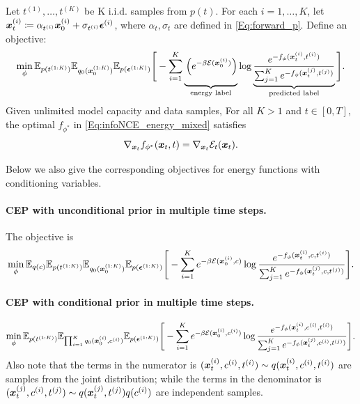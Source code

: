 \begin{theorem}
\label{thrm:infoNCE_energy_mixed}
Let $t^{(1)},\dots,t^{(K)}$ be K i.i.d. samples from $p(t)$. For each $i=1,\dots,K$, let ${\bm{x}}_t^{(i)}\coloneqq \alpha_{t^{(i)}}{\bm{x}}_0^{(i)} + \sigma_{t^{(i)}}\bm{\epsilon}^{(i)}$, where $\alpha_t,\sigma_t$ are defined in \eqref{Eq:forward_p}. Define an objective:
\begin{equation}
\label{Eq:infoNCE_energy_mixed}
\begin{split}
    \min_\phi \E_{p(t^{(1:K)})}\E_{q_0(\x_0^{(1:K)})}\E_{p(\epsilonv^{(1:K)})}\Bigg[
    - \sum_{i=1}^K
    \underbrace{%
        \vphantom{\frac{\exp(-f_\phi(\x_t^{(i)},t))}{\sum_{j=1}^K \exp(-f_\phi(\x_t^{(j)},t))}} 
        \left( e^{-\beta\gE(\x_0^{(i)})} \right)
    }_{\text{energy label}}
    \log \underbrace{\frac{e^{-f_\phi(\x_t^{(i)},t^{(i)})}}{\sum_{j=1}^K e^{-f_\phi(\x_t^{(j)},t^{(j)})}}}_{\text{predicted label}}
\Bigg].
\end{split}
\end{equation}
Given unlimited model capacity and data samples, For all $K>1$ and $t\in[0,T]$, the optimal $f_{\phi^*}$ in \eqref{Eq:infoNCE_energy_mixed} satisfies
\begin{equation}
    \nabla_{{\bm{x}}_t}f_{\phi^*}({\bm{x}}_t,t) = \nabla_{{\bm{x}}_t}{\mathcal{E}}_t({\bm{x}}_t).
\end{equation}
\end{theorem}

Below we also give the corresponding objectives for energy functions with conditioning variables.

\paragraph{CEP with unconditional prior in multiple time steps.}
The objective is
\begin{equation}
\min_\phi \mathbb{E}_{q(c)}\mathbb{E}_{p(t^{(1:K)})}\mathbb{E}_{q_0({\bm{x}}_0^{(1:K)})}\mathbb{E}_{p(\bm{\epsilon}^{(1:K)})}\Bigg[
    - \sum_{i=1}^K
     e^{-\beta{\mathcal{E}}({\bm{x}}_0^{(i)}, c)}
    \log \frac{e^{-f_\phi({\bm{x}}_t^{(i)},c,t^{(i)})}}{\sum_{j=1}^K e^{-f_\phi({\bm{x}}_t^{(j)},c,t^{(j)})}}
\Bigg].
\end{equation}

\paragraph{CEP with conditional prior in multiple time steps.}
\begin{equation}
\min_\phi \mathbb{E}_{p(t^{(1:K)})}\mathbb{E}_{\prod_{i=1}^K q_0({\bm{x}}_0^{(i)},c^{(i)})}\mathbb{E}_{p(\bm{\epsilon}^{(1:K)})}\Bigg[
    - \sum_{i=1}^K
     e^{-\beta{\mathcal{E}}({\bm{x}}_0^{(i)}, c^{(i)})}
    \log \frac{e^{-f_\phi({\bm{x}}_t^{(i)},c^{(i)},t^{(i)})}}{\sum_{j=1}^K e^{-f_\phi({\bm{x}}_t^{(j)},c^{(i)},t^{(j)})}}
\Bigg].
\end{equation}
Also note that the terms in the numerator is $({\bm{x}}_t^{(i)}, c^{(i)}, t^{(i)})\sim q({\bm{x}}_t^{(i)}, c^{(i)}, t^{(i)})$ are samples from the joint distribution; while the terms in the denominator is $({\bm{x}}_t^{(j)}, c^{(i)}, t^{(j)}) \sim q({\bm{x}}_t^{(j)}, t^{(j)})q(c^{(i)})$ are independent samples.


